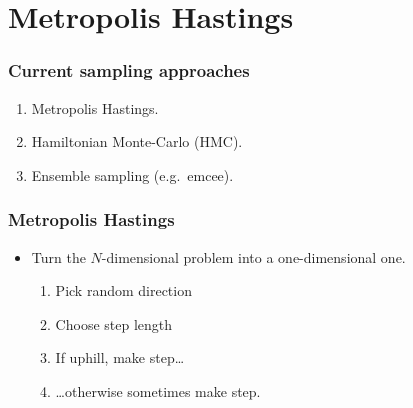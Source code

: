 \documentclass[%
]{beamer}
\begin{document}
\section{Metropolis Hastings}

\begin{frame}
    \frametitle{Current sampling approaches}
    \begin{enumerate}
        \item Metropolis Hastings.
        \item Hamiltonian Monte-Carlo (HMC).
        \item Ensemble sampling (e.g.\ emcee).
    \end{enumerate}
\end{frame}

\begin{frame}
  \frametitle{Metropolis Hastings} 
  \begin{itemize}
      
    \item Turn the $N$-dimensional problem into a one-dimensional one.
      \begin{enumerate}
          
        \item Pick random direction
          
        \item Choose step length
          
        \item If uphill, make step\ldots
          
        \item \ldots otherwise sometimes make step. 
      \end{enumerate}
  \end{itemize}
\end{frame}
\end{document}
